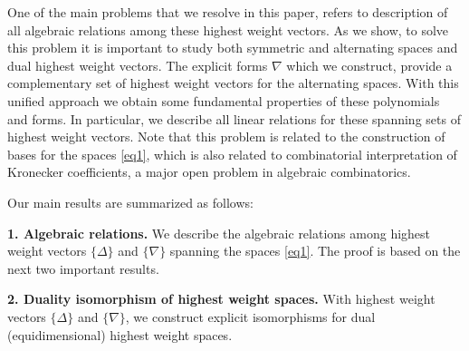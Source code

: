 \documentclass[12pt, reqno]{amsart}
\theoremstyle{definition}
\begin{document}
\vspace{0.5em}

One of the main problems that we resolve in this paper, refers to description %
of all algebraic relations among these %
highest weight vectors. As we show, to solve this problem it is important to study both symmetric and alternating spaces and dual highest weight vectors. The explicit forms $\nabla$ which we construct, provide a complementary set of highest weight vectors for the alternating spaces. With this unified approach %
we obtain some fundamental properties of these polynomials and forms. 
In particular, we describe all linear relations for these spanning sets of highest weight vectors.  
Note that this problem is related to the construction of bases for the spaces \eqref{eq1}, which is also related to combinatorial interpretation of Kronecker coefficients, a major open problem in algebraic combinatorics.



\vspace{0.5em}

Our main results are summarized as follows: 

{\bf 1. Algebraic relations.} 
We describe the algebraic relations among highest weight vectors $\{\Delta \}$ and $\{ \nabla \}$ spanning the spaces \eqref{eq1}. The proof is based on the next two important results. 

{\bf 2. Duality isomorphism of highest weight spaces.} 
With highest weight vectors $\{\Delta \}$ and $\{ \nabla \}$, we construct explicit isomorphisms for dual (equidimensional) highest weight spaces.  
\end{document}
